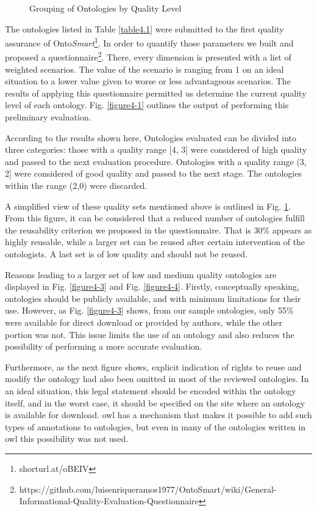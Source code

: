 \begin{figure}
\begin{minipage}{.5\textwidth}
		\caption{Grouping of Ontologies by Quality Level}
		\label{figure4-2}
	\end{minipage}%
\end{figure}



The ontologies listed in Table \ref{table4.1} were submitted to the first quality assurance of Onto\textit{Smart}\footnote{shorturl.at/oBEIV}. In order to quantify those parameters we built and proposed a questionnaire\footnote{https://github.com/luisenriqueramos1977/OntoSmart/wiki/General-Informational-Quality-Evaluation-Questionnaire}. There, every dimension is presented with a list of weighted scenarios. The value of the scenario is ranging from 1 on an ideal situation to a lower value given to worse or less advantageous scenarios. The results of applying this questionnaire permitted us determine the current quality level of each ontology. Fig. \ref{figure4-1} outlines the output of performing this preliminary evaluation. 

According to the results shown here, Ontologies evaluated can be divided into three categories: those with a quality range [4, 3] were considered of high quality and passed to the next evaluation procedure. Ontologies with a quality range (3, 2] were considered of good quality and passed to the next stage. The ontologies within the range (2,0) were discarded.   


A simplified view of these quality sets mentioned above is outlined in Fig. \ref{figure4-2}. From this figure, it can be considered that a reduced number of ontologies fulfill the reusability criterion we proposed in the questionnaire.  That is 30\% appears as highly reusable, while a larger set can be reused   after certain intervention of the ontologists. A last set is of low quality and should not be reused. 






Reasons leading to a larger set of low and medium quality ontologies are displayed in Fig. \ref{figure4-3} and Fig. \ref{figure4-4}. Firstly, conceptually speaking, ontologies should be publicly available, and with minimum limitations for their use.  However, as Fig. \ref{figure4-3} shows, from our sample ontologies, only 55\% were available for direct download or provided by authors, while the other portion was not. This issue limits the use of an ontology and also reduces the possibility of performing a more accurate evaluation. 


Furthermore, as the next figure shows, explicit indication of rights to reuse and modify the ontology had also been omitted in most of the reviewed ontologies. In an ideal situation, this legal statement should be encoded within the ontology itself, and in the worst case, it should be specified on the site where an ontology is available for download. \gls{owl} has a mechanism that makes it possible to add such types of annotations to ontologies, but even in many of the ontologies written in \gls{owl} this possibility was not used.

